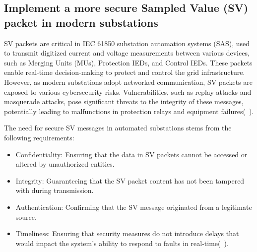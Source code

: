 \subsection{Implement a more secure Sampled Value (SV) packet in modern substations}

SV packets are critical in IEC 61850 substation automation systems (SAS), used to transmit digitized current and voltage measurements between various devices, such as Merging Units (MUs), Protection IEDs, and Control IEDs. These packets enable real-time decision-making to protect and control the grid infrastructure. However, as modern substations adopt networked communication, SV packets are exposed to various cybersecurity risks. Vulnerabilities, such as replay attacks and masquerade attacks, pose significant threats to the integrity of these messages, potentially leading to malfunctions in protection relays and equipment failures(~\cite{hussain2024security}).

The need for secure SV messages in automated substations stems from the following requirements:
\begin{itemize}
	\item Confidentiality: Ensuring that the data in SV packets cannot be accessed or altered by unauthorized entities.
	\item Integrity: Guaranteeing that the SV packet content has not been tampered with during transmission.
	\item Authentication: Confirming that the SV message originated from a legitimate source. 
	\item Timeliness: Ensuring that security measures do not introduce delays that would impact the system's ability to respond to faults in real-time(~\cite{hussain2024security}).
\end{itemize}

